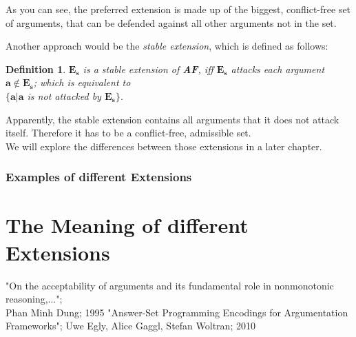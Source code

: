 \documentclass[12pt]{report}
\theoremstyle{break}
\newtheorem{defn}{Definition}[chapter]
\begin{document}
As you can see, the preferred extension is made up of the biggest, conflict-free set of arguments, that can be defended against all other arguments not in the set.

Another approach would be the \textit{stable extension}, which is defined as follows:
\begin{defn}
$\bm{E_{s}}$ is a stable extension of \textbf{AF}, iff $\bm{E_{s}}$ attacks each argument $\bm{a \notin E_{s}}$; which is equivalent to \\
$\bm{\{a|a}$ is not attacked by $\bm{E_{s}\}}$.
\end{defn}

Apparently, the stable extension contains all arguments that it does not attack itself. Therefore it has to be a conflict-free, admissible set.\\
We will explore the differences between those extensions in a later chapter.



\subsection{Examples of different Extensions}

\chapter{The Meaning of different Extensions}











\begin{thebibliography}{1}
	 "On the acceptability of arguments and its fundamental role in nonmonotonic reasoning,...";\\Phan Minh Dung; 1995
	 "Answer-Set Programming Encodings for Argumentation Frameworks"; Uwe Egly, Alice Gaggl, Stefan Woltran; 2010  
\end{thebibliography}
\end{document}
